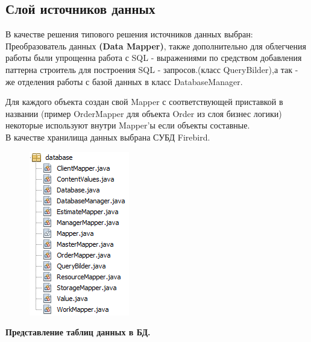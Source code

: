\documentclass[12pt,a4paper,titlepage]{article}
\begin{document}
\subsection{Слой источников данных}
В качестве решения типового решения
источников данных выбран:
\\
Преобразователь данных \textbf{(Data Mapper)}, также дополнительно для облегчения работы были упрощенна работа с SQL - выражениями по средством добавления паттерна строитель для построения SQL - запросов.(класс QueryBilder),а так - же отделения работы с базой данных в класс DatabaseManager.


Для каждого объекта создан свой Mapper с соответствующей приставкой в названии (пример OrderMapper для объекта Order из слоя бизнес логики) некоторые используют внутри Mapper'ы если объекты составные.
\\
В качестве хранилища данных выбрана СУБД Firebird.
\begin{figure}[!ht]
\includegraphics[scale=0.8]{images/databaseMapper.png}\caption{}
\end{figure}
\newpage
\textbf{Представление таблиц данных в БД.}
\\ 
\end{document}
